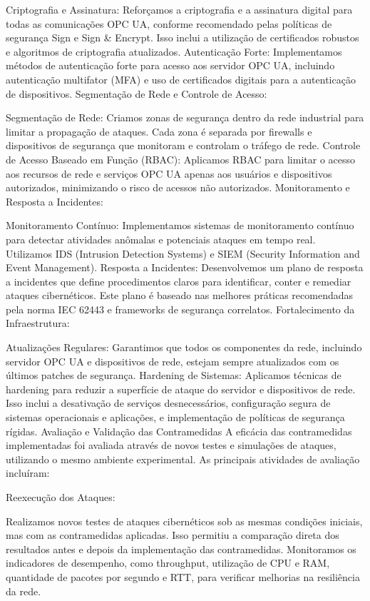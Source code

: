 {    Criptografia e Assinatura: Reforçamos a criptografia e a assinatura digital para todas as comunicações OPC UA, conforme recomendado pelas políticas de segurança Sign e Sign \& Encrypt. Isso inclui a utilização de certificados robustos e algoritmos de criptografia atualizados.
    Autenticação Forte: Implementamos métodos de autenticação forte para acesso aos servidor OPC UA, incluindo autenticação multifator (MFA) e uso de certificados digitais para a autenticação de dispositivos.
    Segmentação de Rede e Controle de Acesso:

    Segmentação de Rede: Criamos zonas de segurança dentro da rede industrial para limitar a propagação de ataques. Cada zona é separada por firewalls e dispositivos de segurança que monitoram e controlam o tráfego de rede.
    Controle de Acesso Baseado em Função (RBAC): Aplicamos RBAC para limitar o acesso aos recursos de rede e serviços OPC UA apenas aos usuários e dispositivos autorizados, minimizando o risco de acessos não autorizados.
    Monitoramento e Resposta a Incidentes:

    Monitoramento Contínuo: Implementamos sistemas de monitoramento contínuo para detectar atividades anômalas e potenciais ataques em tempo real. Utilizamos IDS (Intrusion Detection Systems) e SIEM (Security Information and Event Management).
    Resposta a Incidentes: Desenvolvemos um plano de resposta a incidentes que define procedimentos claros para identificar, conter e remediar ataques cibernéticos. Este plano é baseado nas melhores práticas recomendadas pela norma IEC 62443 e frameworks de segurança correlatos.
    Fortalecimento da Infraestrutura:

    Atualizações Regulares: Garantimos que todos os componentes da rede, incluindo servidor OPC UA e dispositivos de rede, estejam sempre atualizados com os últimos patches de segurança.
    Hardening de Sistemas: Aplicamos técnicas de hardening para reduzir a superfície de ataque do servidor e dispositivos de rede. Isso inclui a desativação de serviços desnecessários, configuração segura de sistemas operacionais e aplicações, e implementação de políticas de segurança rígidas.
    Avaliação e Validação das Contramedidas
    A eficácia das contramedidas implementadas foi avaliada através de novos testes e simulações de ataques, utilizando o mesmo ambiente experimental. As principais atividades de avaliação incluíram:

    Reexecução dos Ataques:

    Realizamos novos testes de ataques cibernéticos sob as mesmas condições iniciais, mas com as contramedidas aplicadas. Isso permitiu a comparação direta dos resultados antes e depois da implementação das contramedidas. Monitoramos os indicadores de desempenho, como throughput, utilização de CPU e RAM, quantidade de pacotes por segundo e RTT, para verificar melhorias na resiliência da rede.

}
